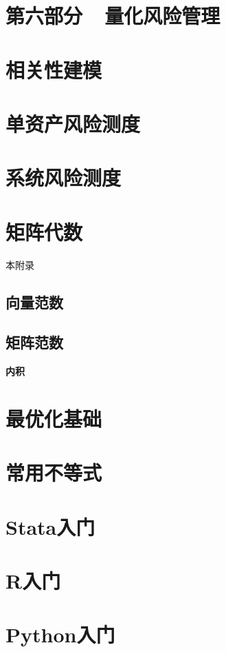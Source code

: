 \documentclass[cn,11pt,chinese]{elegantbook}
\begin{document}
\specialsectioning
\chapter{第六部分~~量化风险管理}
\setcounter{secnumdepth}{1}

\chapter{相关性建模}
\chapter{单资产风险测度}
\chapter{系统风险测度}


\nocite{*} 

\appendix

\chapter{矩阵代数}


本附录

\section{向量范数}

\section{矩阵范数}

\textbf{内积}
 
\chapter{最优化基础}

\chapter{常用不等式}

\chapter{Stata入门}
\chapter{R入门}
\chapter{Python入门}
\end{document}
